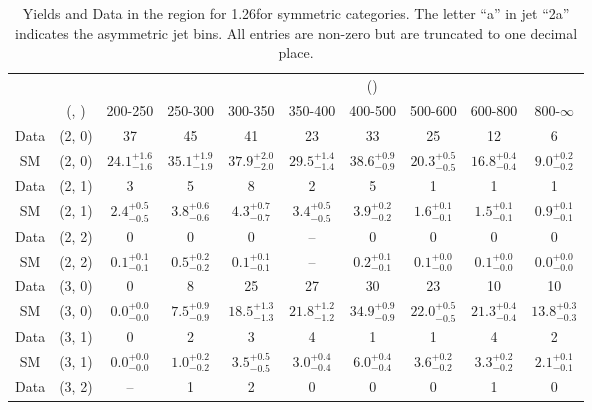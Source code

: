 \begin{table}[h!]
\tiny
\centering
\caption{Yields and Data in the \mmj region for 1.26\ifb for symmetric categories. The letter ``a'' in jet \eg ``2a''  indicates the asymmetric jet bins. All entries are non-zero but are truncated to one decimal place.\label{tab:yieldsall_mumu_comb_sym}}
\begin{tabular}
{cccccccccc}
	\hline\hline
&	&	& \multicolumn{8}{c}{\scalht (\gev)}\\ 
	&	 (\njet, \nb) & 200-250 & 250-300 & 300-350 & 350-400 & 400-500 & 500-600 & 600-800 & 800-$\infty$ \\ [0.8ex] 
\hline
	Data & (2, 0) & 37 & 45 & 41 & 23 & 33 & 25 & 12 & 6 \\[0.5ex] 
	SM & (2, 0) & $24.1^{+ 1.6 }_{- 1.6 }$ & $35.1^{+ 1.9 }_{- 1.9 }$ & $37.9^{+ 2.0 }_{- 2.0 }$ & $29.5^{+ 1.4 }_{- 1.4 }$ & $38.6^{+ 0.9 }_{- 0.9 }$ & $20.3^{+ 0.5 }_{- 0.5 }$ & $16.8^{+ 0.4 }_{- 0.4 }$ & $9.0^{+ 0.2 }_{- 0.2 }$ \\[0.5ex] 
	Data & (2, 1) & 3 & 5 & 8 & 2 & 5 & 1 & 1 & 1 \\[0.5ex] 
	SM & (2, 1) & $2.4^{+ 0.5 }_{- 0.5 }$ & $3.8^{+ 0.6 }_{- 0.6 }$ & $4.3^{+ 0.7 }_{- 0.7 }$ & $3.4^{+ 0.5 }_{- 0.5 }$ & $3.9^{+ 0.2 }_{- 0.2 }$ & $1.6^{+ 0.1 }_{- 0.1 }$ & $1.5^{+ 0.1 }_{- 0.1 }$ & $0.9^{+ 0.1 }_{- 0.1 }$ \\[0.5ex] 
	Data & (2, 2) & 0 & 0 & 0 & -- & 0 & 0 & 0 & 0 \\[0.5ex] 
	SM & (2, 2) & $0.1^{+ 0.1 }_{- 0.1 }$ & $0.5^{+ 0.2 }_{- 0.2 }$ & $0.1^{+ 0.1 }_{- 0.1 }$ & -- & $0.2^{+ 0.1 }_{- 0.1 }$ & $0.1^{+ 0.0 }_{- 0.0 }$ & $0.1^{+ 0.0 }_{- 0.0 }$ & $0.0^{+ 0.0 }_{- 0.0 }$ \\[0.5ex] 
	Data & (3, 0) & 0 & 8 & 25 & 27 & 30 & 23 & 10 & 10 \\[0.5ex] 
	SM & (3, 0) & $0.0^{+ 0.0 }_{- 0.0 }$ & $7.5^{+ 0.9 }_{- 0.9 }$ & $18.5^{+ 1.3 }_{- 1.3 }$ & $21.8^{+ 1.2 }_{- 1.2 }$ & $34.9^{+ 0.9 }_{- 0.9 }$ & $22.0^{+ 0.5 }_{- 0.5 }$ & $21.3^{+ 0.4 }_{- 0.4 }$ & $13.8^{+ 0.3 }_{- 0.3 }$ \\[0.5ex] 
	Data & (3, 1) & 0 & 2 & 3 & 4 & 1 & 1 & 4 & 2 \\[0.5ex] 
	SM & (3, 1) & $0.0^{+ 0.0 }_{- 0.0 }$ & $1.0^{+ 0.2 }_{- 0.2 }$ & $3.5^{+ 0.5 }_{- 0.5 }$ & $3.0^{+ 0.4 }_{- 0.4 }$ & $6.0^{+ 0.4 }_{- 0.4 }$ & $3.6^{+ 0.2 }_{- 0.2 }$ & $3.3^{+ 0.2 }_{- 0.2 }$ & $2.1^{+ 0.1 }_{- 0.1 }$ \\[0.5ex] 
	Data & (3, 2) & -- & 1 & 2 & 0 & 0 & 0 & 1 & 0 \\[0.5ex] 

\end{tabular}
\end{table}

